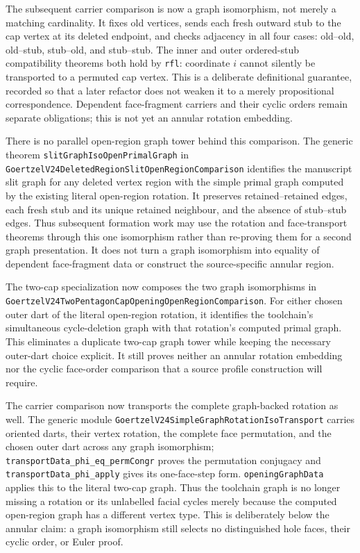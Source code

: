 \documentclass[11pt]{article}
\theoremstyle{definition}
\begin{document}
The subsequent carrier comparison is now a graph isomorphism, not merely a
matching cardinality.  It fixes old vertices, sends each fresh outward stub to
the cap vertex at its deleted endpoint, and checks adjacency in all four
cases: old--old, old--stub, stub--old, and stub--stub.  The inner and outer
ordered-stub compatibility theorems both hold by \texttt{rfl}: coordinate
$i$ cannot silently be transported to a permuted cap vertex.  This is a
deliberate definitional guarantee, recorded so that a later refactor does not
weaken it to a merely propositional correspondence.  Dependent face-fragment
carriers and their cyclic orders remain separate obligations; this is not yet
an annular rotation embedding.

There is no parallel open-region graph tower behind this comparison.  The
generic theorem
\texttt{slitGraphIsoOpenPrimalGraph} in
\texttt{GoertzelV24DeletedRegionSlitOpenRegionComparison} identifies the
manuscript slit graph for any deleted vertex region with the simple primal
graph computed by the existing literal open-region rotation.  It preserves
retained--retained edges, each fresh stub and its unique retained neighbour,
and the absence of stub--stub edges.  Thus subsequent formation work may use
the rotation and face-transport theorems through this one isomorphism rather
than re-proving them for a second graph presentation.  It does not turn a
graph isomorphism into equality of dependent face-fragment data or construct
the source-specific annular region.

The two-cap specialization now composes the two graph isomorphisms in
\texttt{GoertzelV24TwoPentagonCapOpeningOpenRegionComparison}.  For either
chosen outer dart of the literal open-region rotation, it identifies the
toolchain's simultaneous cycle-deletion graph with that rotation's computed
primal graph.  This eliminates a duplicate two-cap graph tower while keeping
the necessary outer-dart choice explicit.  It still proves neither an
annular rotation embedding nor the cyclic face-order comparison that a source
profile construction will require.

The carrier comparison now transports the complete graph-backed rotation as
well.  The generic module
\texttt{GoertzelV24SimpleGraphRotationIsoTransport} carries oriented darts,
their vertex rotation, the complete face permutation, and the chosen outer
dart across any graph isomorphism;
\texttt{transportData\_phi\_eq\_permCongr} proves the permutation
conjugacy and \texttt{transportData\_phi\_apply} gives its one-face-step
form.  \texttt{openingGraphData} applies this to the literal two-cap graph.
Thus the toolchain graph is no longer missing a rotation or its unlabelled
facial cycles merely because the computed open-region graph has a different
vertex type.  This is deliberately below the annular claim: a graph
isomorphism still selects no distinguished hole faces, their cyclic order, or
Euler proof.
\end{document}
